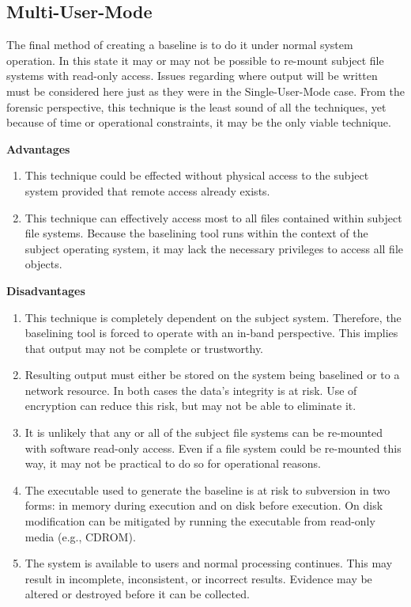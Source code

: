 \documentclass[10pt]{article}
\begin{document}
\subsection{Multi-User-Mode}

The final method of creating a baseline is to do it under normal
system operation.  In this state it may or may not be possible to
re-mount subject file systems with read-only access.  Issues
regarding where output will be written must be considered here just
as they were in the Single-User-Mode case.  From the forensic
perspective, this technique is the least sound of all the techniques,
yet because of time or operational constraints, it may be the only
viable technique.

  \textbf{Advantages}

\begin{enumerate}

  \item
  This technique could be effected without physical access to the
  subject system provided that remote access already exists.

  \item
  This technique can effectively access most to all files contained
  within subject file systems.  Because the baselining tool runs
  within the context of the subject operating system, it may lack
  the necessary privileges to access all file objects.

\end{enumerate}

  \textbf{Disadvantages}

\begin{enumerate}

  \item
  This technique is completely dependent on the subject system.
  Therefore, the baselining tool is forced to operate with an
  in-band perspective.  This implies that output may not be complete
  or trustworthy.

  \item
  Resulting output must either be stored on the system being
  baselined or to a network resource.  In both cases the data's
  integrity is at risk.  Use of encryption can reduce this risk,
  but may not be able to eliminate it.

  \item
  It is unlikely that any or all of the subject file systems can
  be re-mounted with software read-only access.  Even if a file
  system could be re-mounted this way, it may not be practical to
  do so for operational reasons.

  \item
  The executable used to generate the baseline is at risk to
  subversion in two forms: in memory during execution and on disk
  before execution.  On disk modification can be mitigated by
  running the executable from read-only media (e.g., CDROM).

  \item
  The system is available to users and normal processing continues.
  This may result in incomplete, inconsistent, or incorrect results.
  Evidence may be altered or destroyed before it can be collected.

\end{enumerate}
\end{document}
